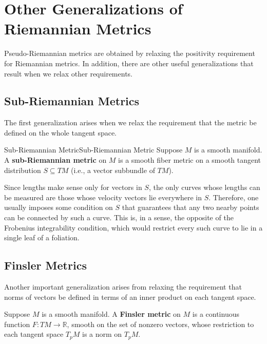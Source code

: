 \documentclass[../main.tex]{subfiles}
\begin{document}
\section{Other Generalizations of Riemannian Metrics}
Pseudo-Riemannian metrics are obtained by relaxing the positivity requirement for Riemannian metrics. In addition, there are other useful generalizations that result when we relax other requirements.

\subsection{Sub-Riemannian Metrics}
The first generalization arises when we relax the requirement that the metric be defined on the whole tangent space.

\begin{definition}{Sub-Riemannian Metric}{Sub-Riemannian Metric}
	Suppose $M$ is a smooth manifold. A \textbf{sub-Riemannian metric} on $M$ is a smooth fiber metric on a smooth tangent distribution $S \subseteq TM$ (i.e., a vector subbundle of $TM$).
\end{definition}
Since lengths make sense only for vectors in $S$, the only curves whose lengths can be measured are those whose velocity vectors lie everywhere in $S$. Therefore, one usually imposes some condition on $S$ that guarantees that any two nearby points can be connected by such a curve. This is, in a sense, the opposite of the Frobenius integrability condition, which would restrict every such curve to lie in a single leaf of a foliation.

\subsection{Finsler Metrics}
Another important generalization arises from relaxing the requirement that norms of vectors be defined in terms of an inner product on each tangent space.

Suppose $M$ is a smooth manifold. A \textbf{Finsler metric} on $M$ is a continuous function $F: TM \to \mathbb{R}$, smooth on the set of nonzero vectors, whose restriction to each tangent space $T_pM$ is a norm on $T_pM$.
\end{document}
